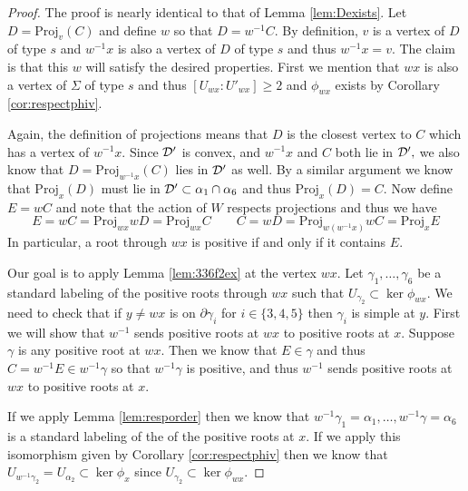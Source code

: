 \documentclass[class=book, crop=false]{standalone}
\begin{document}
\begin{proof}
	The proof is nearly identical to that of Lemma \ref{lem:Dexists}. Let $D=\mathrm{Proj}_{v}(C)$ and define $w$ so that $D=w^{-1}C.$ By definition, $v$ is a vertex of $D$ of type $s$ and $w^{-1}x$ is also a vertex of $D$ of type $s$ and thus $w^{-1}x=v.$ The claim is that this $w$ will satisfy the desired properties. First we mention that $wx$ is also a vertex of $\Sigma$ of type $s$ and thus $[U_{wx}:U'_{wx}]\ge 2$ and $\phi_{wx}$ exists by Corollary \ref{cor:respectphiv}. 
	
	Again, the definition of projections means that $D$ is the closest vertex to $C$ which has a vertex of $w^{-1}x.$ Since $\mathcal{D}'$ is convex, and $w^{-1}x$ and $C$ both lie in $\mathcal{D}',$ we also know that $D=\mathrm{Proj}_{w^{-1}x}(C)$ lies in $\mathcal{D}'$ as well. By a similar argument we know that $\mathrm{Proj}_{x}(D)$ must lie in $\mathcal{D}'\subset \alpha_1\cap \alpha_6$ and thus $\mathrm{Proj}_{x}(D)=C.$ Now define $E=wC$ and note that the action of $W$ respects projections and thus we have
	\[
		E=wC=\mathrm{Proj}_{wx}{wD}=\mathrm{Proj}_{wx}{C} \qquad C=wD=\mathrm{Proj}_{w(w^{-1}x)}{wC}=\mathrm{Proj}_{x}{E}
	\]
In particular, a root through $wx$ is positive if and only if it contains $E.$

Our goal is to apply Lemma \ref{lem:336f2ex} at the vertex $wx.$ Let $\gamma_1,\dots,\gamma_6$ be a standard labeling of the positive roots through $wx$ such that $U_{\gamma_2}\subset \ker \phi_{wx}.$ We need to check that if $y\neq wx$ is on $\partial\gamma_i$ for $i\in \{3,4,5\}$ then $\gamma_i$ is simple at $y.$ First we will show that $w^{-1}$ sends positive roots at $wx$ to positive roots at $x.$ Suppose $\gamma$ is any positive root at $wx.$ Then we know that $E\in \gamma$ and thus $C=w^{-1}E\in w^{-1}\gamma$ so that $w^{-1}\gamma$ is positive, and thus $w^{-1}$ sends positive roots at $wx$ to positive roots at $x.$

If we apply Lemma \ref{lem:resporder} then we know that $w^{-1}\gamma_1=\alpha_1,\dots,w^{-1}\gamma=\alpha_6$ is a standard labeling of the of the positive roots at $x.$ If we apply this isomorphism given by Corollary \ref{cor:respectphiv} then we know that $U_{w^{-1}\gamma_2}=U_{\alpha_2}\subset \ker \phi_x$ since $U_{\gamma_2}\subset \ker \phi_{wx}.$ 


\end{proof}
\end{document}
